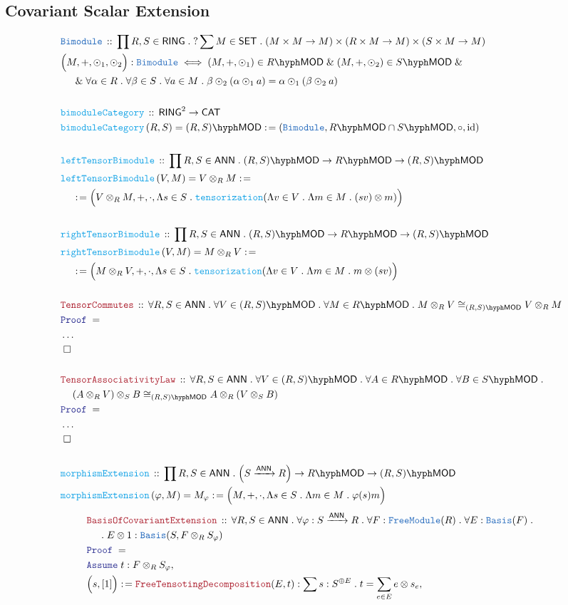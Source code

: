 \documentclass[12pt]{scrartcl}%
\newcommand{\TYPE}[1]{\textcolor{NavyBlue}{\mathtt{#1}}}%
\newcommand{\FUNC}[1]{\textcolor{Cerulean}{\mathtt{#1}}}%
\newcommand{\LOGIC}[1]{\textcolor{Blue}{\mathtt{#1}}}%
\newcommand{\THM}[1]{\textcolor{Maroon}{\mathtt{#1}}}%
\renewcommand{\.}{\; . \;} %
\newcommand{\de}{: \kern 0.1pc =} %
\newcommand{\Act}[1]{\left( #1 \right)} %
\newcommand{\Theorem}[2]{& \THM{#1} \, :: \, #2 \\ & \Proof = \\ } %
\newcommand{\DeclareType}[2]{& \TYPE{#1} \, :: \, #2 \\}%
\newcommand{\DefineType}[3]{& #1 : \TYPE{#2} \iff #3 \\}%
\newcommand{\DeclareFunc}[2]{& \FUNC{#1} \, :: \, #2 \\}%
\newcommand{\DefineNamedFunc}[4]{&  \FUNC{#1}\Act{#2} = #3 \de #4 \\}%
\newcommand{\NewLine}{\\ & \kern 1pc}%
\newcommand{\Page}[1]{ \begin{align*} #1 \end{align*}  }%
\newcommand{\NoProof}{ & \ldots \\ \EndProof}%
\renewcommand{\And}{\; \& \;}%
\DeclareMathOperator*{\id}{id}%
\newcommand{\Say}[3]{& #1 \de #2 : #3, \\} %
\newcommand{\Assume}[2]{& \LOGIC{Assume} \; #1 : #2, \\} %
\newcommand{\QED}{\; \square} %
\newcommand{\EndProof}{& \QED \\} %
\newcommand{\Proof}{\LOGIC{Proof} \; } %
\newcommand{\Arrow}[1]{\xrightarrow{#1}}%
\newcommand{\CAT}{\mathsf{CAT}} %
\newcommand{\SET}{\mathsf{SET}} %
\newcommand{\Basis}{\TYPE{Basis}} %
\newcommand{\FM}{\TYPE{FreeModule}}
\newcommand{\LMOD}[1]{#1\hyph\mathsf{MOD}} %
\newcommand{\RING}{\mathsf{RING}} %
\newcommand{\ANN}{\mathsf{ANN}} %
\begin{document}
\subsection{Covariant Scalar Extension}
\Page{
	\DeclareType{Bimodule}{\prod R,S \in \RING \. ?\sum M \in \SET \. (M \times M \to M) \times (R \times M \to M) \times (S \times M \to M)}
	\DefineType{\Big(M,+,\odot_1,\odot_2\Big)}{Bimodule}{(M,+,\odot_1) \in \LMOD{R} \And (M,+,\odot_2) \in \LMOD{S} 
		\And \NewLine \And \forall \alpha \in R \. \forall \beta \in S \. \forall a \in  M \. \beta \odot_2 (\alpha \odot_1 a) = \alpha \odot_1 (\beta \odot_2 a)} 
	\\
	\DeclareFunc{bimoduleCategory}{\RING^2 \to \CAT}
	\DefineNamedFunc{bimoduleCategory}{R,S}{\LMOD{(R,S)}}{( \TYPE{Bimodule}, \LMOD{R} \cap \LMOD{S},\circ,\id )}
	\\
	\DeclareFunc{leftTensorBimodule}{\prod R,S \in \ANN \. \LMOD{(R,S)} \to \LMOD{R} \to \LMOD{(R,S)}}
	\DefineNamedFunc{leftTensorBimodule}{ V,M }{V \otimes_R M}{ \NewLine \de
		\Big(V \otimes_R M, +, \cdot, \Lambda s \in S \. \FUNC{tensorization}(\Lambda v \in V \. \Lambda m \in M \. (sv) \otimes m ) \Big)} 
	\\
	\DeclareFunc{rightTensorBimodule}{\prod R,S \in \ANN \. \LMOD{(R,S)} \to \LMOD{R} \to \LMOD{(R,S)}}
	\DefineNamedFunc{rightTensorBimodule}{ V,M }{M \otimes_R V}{ \NewLine \de
		\Big(M \otimes_R V, +, \cdot, \Lambda s \in S \. \FUNC{tensorization}(\Lambda v \in V \. \Lambda m \in M \. m \otimes (sv)  \Big)} 
	\\
	\Theorem{TensorCommutes}{\forall R,S \in \ANN \. \forall V \in \LMOD{(R,S)} \. \forall M \in \LMOD{R} \. M \otimes_R V \cong_{\LMOD{(R,S)}} V \otimes_R M }
	\NoProof
	\\
	\Theorem{TensorAssociativityLaw}{
		\forall R,S \in \ANN \. \forall V \in \LMOD{(R,S)} \. \forall A \in \LMOD{R} \. \forall B \in \LMOD{S} \.   
		\NewLine (A \otimes_R V) \otimes_S B  \cong_{\LMOD{(R,S)}} A \otimes_R (V \otimes_S B)
	}
	\NoProof
	\\
	\DeclareFunc{morphismExtension}{\prod R,S \in \ANN \.  \Big(S \Arrow{\ANN} R\Big) \to \LMOD{R} \to \LMOD{(R,S)}}
	\DefineNamedFunc{morphismExtension}{\varphi,M}{M_\varphi}{\Big( M,+,\cdot,\Lambda s \in S \. \Lambda m \in M \. \varphi(s)m \Big) }
}\Page{
	\Theorem{BasisOfCovariantExtension}{
		\forall R,S \in \ANN \. 
		\forall \varphi : S \Arrow{\ANN} R \. 
		\forall F : \FM(R) \. 
		\forall E : \Basis(F) \. \NewLine \.  
		E \otimes 1 : \Basis(S,F \otimes_R S_\varphi)
	}
	\Assume{t}{F \otimes_R S_\varphi}
	\Say{\Big(s,[1]\Big)}{\THM{FreeTensotingDecomposition}(E,t)}{\sum s : S^{\oplus E} \.  t = \sum_{e \in E} e \otimes s_e}
}
\end{document}

